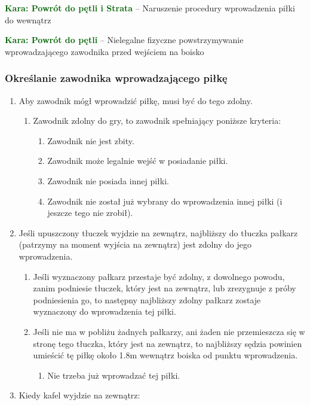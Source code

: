 \documentclass[11pt,a4paper]{article}
\newcommand\penaltyd[2]{\bgroup\textcolor{darkgreen}{\textbf{Kara: #1}} -- #2}
\begin{document}
\penaltyd{Powrót do pętli i Strata}{Naruszenie procedury wprowadzenia piłki do wewnątrz}

\penaltyd{Powrót do pętli}{Nielegalne fizyczne powstrzymywanie wprowadzającego zawodnika przed wejściem na boisko}

\subsubsection{Określanie zawodnika wprowadzającego piłkę}
\begin{enumerate}
  \item Aby zawodnik mógł wprowadzić piłkę, musi być do tego zdolny.
  \begin{enumerate}
    \item Zawodnik zdolny do gry, to zawodnik spełniający poniższe kryteria:
    \begin{enumerate}
      \item Zawodnik nie jest zbity.
      \item Zawodnik może legalnie wejść w posiadanie piłki.
      \item Zawodnik nie posiada innej piłki.
      \item Zawodnik nie został już wybrany do wprowadzenia innej piłki (i jeszcze tego nie zrobił).
    \end{enumerate}
  \end{enumerate}
  \item Jeśli upuszczony tłuczek wyjdzie na zewnątrz, najbliższy do tłuczka pałkarz (patrzymy na moment wyjścia na zewnątrz) jest zdolny do jego wprowadzenia.
  \begin{enumerate}
    \item Jeśli wyznaczony pałkarz przestaje być zdolny, z dowolnego powodu, zanim podniesie tłuczek, który jest na zewnątrz, lub zrezygnuje z próby podniesienia go, to następny najbliższy zdolny pałkarz zostaje wyznaczony do wprowadzenia tej piłki.
    \item Jeśli nie ma w pobliżu żadnych pałkarzy, ani żaden nie przemieszcza się w stronę tego tłuczka, który jest na zewnątrz, to najbliższy sędzia powinien umieścić tę piłkę około 1.8m wewnątrz boiska od punktu wprowadzenia.
    \begin{enumerate}
      \item Nie trzeba już wprowadzać tej piłki.
    \end{enumerate}
  \end{enumerate}
  \item Kiedy kafel wyjdzie na zewnątrz:

\end{enumerate}
\end{document}
